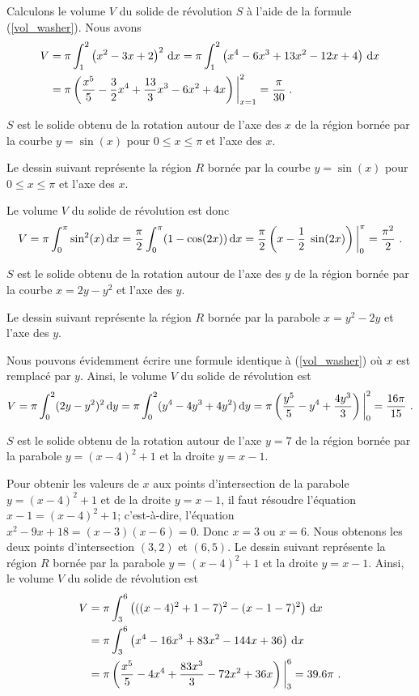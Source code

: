 {\begin{egg}
Calculons le volume $V$ du solide de révolution $S$ à l'aide de
la formule (\ref{vol_washer}).  Nous avons
\begin{align*}
V &= \pi \int_1^2 \left(x^2-3x+2\right)^2 \,\mathrm{d}x =
\pi \int_1^2 \left( x^4-6x^3+13x^2 -12x +4\right) \,\mathrm{d}x \\
&= \pi \left( \frac{x^5}{5} -\frac{3}{2} x^4 +\frac{13}{3}x^3 - 6x^2 +
  4x \right)\bigg|_{x=1}^2
= \frac{\pi}{30} \; .
\end{align*}

 $S$ est le solide obtenu de la rotation autour de l'axe des $x$ de
la région bornée par la courbe $y=\sin(x)$ pour $0\leq x \leq \pi$ et l'axe
des $x$.

Le dessin suivant représente la région $R$ bornée par la
courbe $y=\sin(x)$ pour $0\leq x \leq \pi$ et l'axe des $x$.

Le volume $V$ du solide de révolution est donc
\[
V = \pi \int_0^{\pi} \sin^2(x) \,\mathrm{d}x
= \frac{\pi}{2}\int_0^\pi (1-\cos(2x)) \,\mathrm{d}x
= \frac{\pi}{2} \left( x - \frac{1}{2}\; \sin(2x) \right)\bigg|_0^\pi
= \frac{\pi^2}{2} \ .
\]

 $S$ est le solide obtenu de la rotation autour de l'axe des $y$ de
la région bornée par la courbe $x=2y-y^2$ et l'axe des $y$.

Le dessin suivant représente la région $R$ bornée par
la parabole $x=y^2-2y$ et l'axe des $y$.

Nous pouvons évidemment écrire une formule identique à
(\ref{vol_washer}) où $x$ est remplacé par $y$.  Ainsi, le volume $V$
du solide de révolution est
\[
V = \pi \int_0^2 (2y-y^2)^2 \,\mathrm{d}y
= \pi \int_0^2 (y^4-4y^3+4y^2)\,\mathrm{d}y
= \pi \left( \frac{y^5}{5} - y^4 + \frac{4y^3}{3}\right)\bigg|_0^2
= \frac{16\pi}{15} \ .
\]

 $S$ est le solide obtenu de la rotation autour de l'axe $y=7$ de la
région bornée par la parabole $y=(x-4)^2+1$ et la droite $y=x-1$.

Pour obtenir les valeurs de $x$ aux points d'intersection de la parabole
$y=(x-4)^2+1$ et de la droite $y=x-1$, il faut résoudre l'équation
$x-1= (x-4)^2+1$; c'est-à-dire, l'équation
$x^2-9x+18 = (x-3)(x-6) = 0$.  Donc $x = 3$ ou $x=6$.  Nous obtenons 
les deux points d'intersection $(3,2)$ et $(6,5)$.  Le dessin suivant
représente la région $R$ bornée par la parabole $y=(x-4)^2+1$ et la
droite $y=x-1$.
Ainsi, le volume $V$ du solide de révolution est
\begin{align*}
V &= \pi \int_3^6 \left( ((x-4)^2+1-7)^2 - (x-1-7)^2\right) \,\mathrm{d}x \\
&= \pi \int_3^6 \left( x^4 -16 x^3 + 83 x^2 -144 x + 36 \right) \,\mathrm{d}x \\
&= \pi \left( \frac{x^5}{5} - 4 x^4 + \frac{83x^3}{3} - 72 x^2 +
36x\right)\bigg|_3^6 = 39.6 \pi \ .
\end{align*}


\end{egg}}
